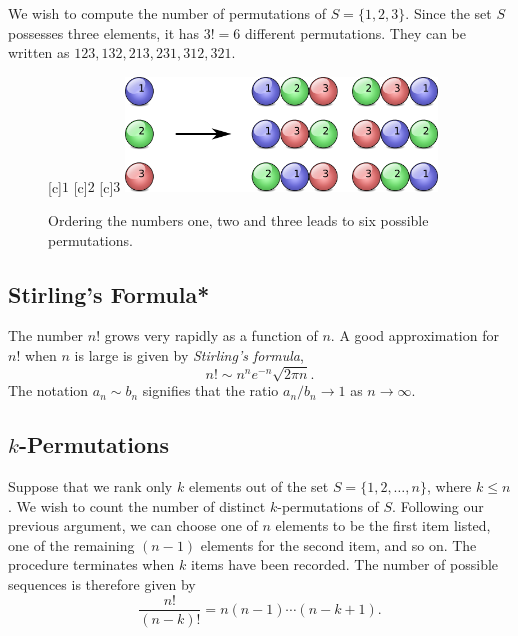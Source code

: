 \begin{example}
We wish to compute the number of permutations of $S = \{ 1, 2, 3 \}$.
Since the set $S$ possesses three elements, it has $3! = 6$ different permutations.
They can be written as $123, 132, 213, 231, 312, 321$.
\end{example}

\begin{figure}[htb!]
\begin{center}
\begin{psfrags}
[c]{$1$}
[c]{$2$}
[c]{$3$}
\includegraphics[height=3.06cm]{Figures/4Chapter/permutation}
\end{psfrags}
\caption{Ordering the numbers one, two and three leads to six possible permutations.}
\label{figure:Permutation}
\end{center}
\end{figure}


\subsection{Stirling's Formula*}

The number $n!$ grows very rapidly as a function of $n$.
A good approximation for $n!$ when $n$ is large is given by \emph{Stirling's formula}, 
\begin{equation*}
n! \sim n^n e^{-n} \sqrt{ 2 \pi n} .
\end{equation*}
The notation $a_n \sim b_n$ signifies that the ratio $a_n / b_n \rightarrow 1$ as $n \rightarrow \infty$.


\subsection{$k$-Permutations}

Suppose that we rank only $k$ elements out of the set $S = \{ 1, 2, \ldots, n \}$, where $k \leq n$.
We wish to count the number of distinct $k$-permutations of $S$.
Following our previous argument, we can choose one of $n$ elements to be the first item listed, one of the remaining $(n-1)$ elements for the second item, and so on.
The procedure terminates when $k$ items have been recorded.
The number of possible sequences is therefore given by
\begin{equation*}
\frac{n!}{(n-k)!} = n (n-1) \cdots (n-k+1) .
\end{equation*}

